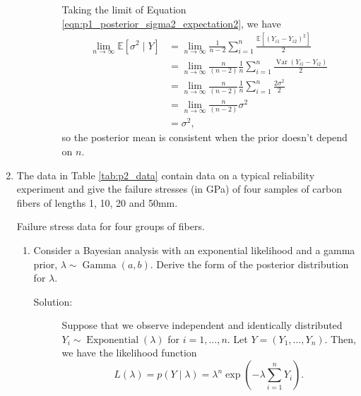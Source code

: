 \documentclass[letterpaper,11pt]{article}
\begin{document}
\begin{enumerate}
\begin{enumerate}
\begin{description}
        Taking the limit of Equation \ref{eqn:p1_posterior_sigma2_expectation2},
        we have
        \begin{align}
          \lim_{n\rightarrow\infty}\mathbb{E}\left[\sigma^2 \mid Y\right]
          &= \lim_{n\rightarrow\infty} \frac{1}{n-2}\sum_{i=1}^n \frac{\mathbb{E}\left[
            \left(Y_{i1} - Y_{i2}\right)^2\right]}{2}
            \nonumber\\
          &= \lim_{n\rightarrow\infty} \frac{n}{\left(n-2\right)}
            \frac{1}{n}\sum_{i=1}^n \frac{\operatorname{Var}\left(Y_{i1} - Y_{i2}\right)}{2} \nonumber\\
          &= \lim_{n\rightarrow\infty} \frac{n}{\left(n-2\right)}
            \frac{1}{n}\sum_{i=1}^n \frac{2\sigma^2}{2} \nonumber\\
          &= \lim_{n\rightarrow\infty} \frac{n}{\left(n-2\right)}\sigma^2 \nonumber\\
          &= \sigma^2,
        \end{align}
        so the posterior mean is consistent when the prior doesn't depend on $n$.
      \end{description}
    \end{enumerate}
  \item The data in Table \ref{tab:p2_data} contain data on a typical
    reliability experiment and give the failure stresses (in GPa) of four
    samples of carbon fibers of lengths 1, 10, 20 and 50mm.

    \begin{table}
      \centering
      \tiny
      
      \caption{Failure stress data for four groups of fibers.}
      \label{tab:p2_data}
    \end{table}

    \begin{enumerate}
    \item Consider a Bayesian analysis with an exponential likelihood and a
      gamma prior, $\lambda \sim \operatorname{Gamma}(a,b)$. Derive the form of
      the posterior distribution for $\lambda$.

      \begin{description}
      \item[Solution:] Suppose that we observe independent and identically
        distributed $Y_i \sim \operatorname{Exponential}(\lambda)$ for
        $i = 1,\ldots,n$. Let $Y = \left(Y_1,\ldots,Y_n\right)$. Then, we have
        the likelihood function
        \begin{equation}
          L(\lambda) = p\left(Y\mid\lambda\right) = \lambda^n\exp\left(
            -\lambda\sum_{i=1}^nY_i
          \right).
          \label{eqn:p2_likelihood}
        \end{equation}


\end{description}
\end{enumerate}
\end{enumerate}
\end{document}
